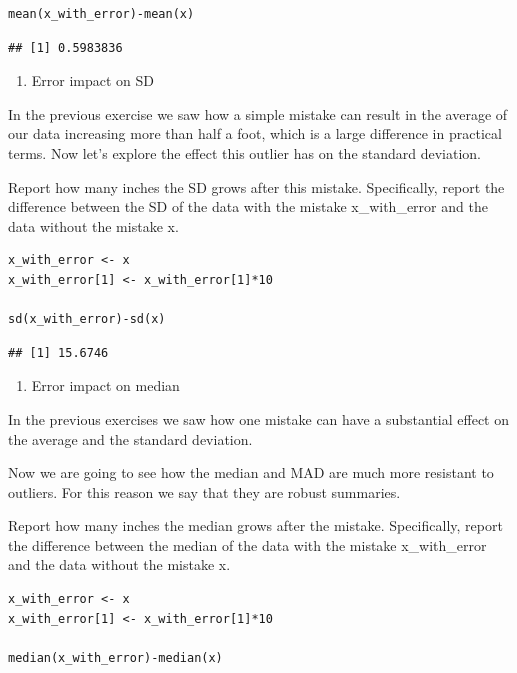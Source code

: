\documentclass[
]{article}
\providecommand{\tightlist}{%
  \setlength{\itemsep}{0pt}\setlength{\parskip}{0pt}}
\begin{document}
\begin{verbatim}
mean(x_with_error)-mean(x)
\end{verbatim}

\begin{verbatim}
## [1] 0.5983836
\end{verbatim}

\begin{enumerate}
\def\labelenumi{\arabic{enumi}.}
\setcounter{enumi}{3}
\tightlist
\item
  Error impact on SD
\end{enumerate}

In the previous exercise we saw how a simple mistake can result in the
average of our data increasing more than half a foot, which is a large
difference in practical terms. Now let's explore the effect this outlier
has on the standard deviation.

Report how many inches the SD grows after this mistake. Specifically,
report the difference between the SD of the data with the mistake
x\_with\_error and the data without the mistake x.

\begin{verbatim}
x_with_error <- x
x_with_error[1] <- x_with_error[1]*10

sd(x_with_error)-sd(x)
\end{verbatim}

\begin{verbatim}
## [1] 15.6746
\end{verbatim}

\begin{enumerate}
\def\labelenumi{\arabic{enumi}.}
\setcounter{enumi}{4}
\tightlist
\item
  Error impact on median
\end{enumerate}

In the previous exercises we saw how one mistake can have a substantial
effect on the average and the standard deviation.

Now we are going to see how the median and MAD are much more resistant
to outliers. For this reason we say that they are robust summaries.

Report how many inches the median grows after the mistake. Specifically,
report the difference between the median of the data with the mistake
x\_with\_error and the data without the mistake x.

\begin{verbatim}
x_with_error <- x
x_with_error[1] <- x_with_error[1]*10

median(x_with_error)-median(x)
\end{verbatim}
\end{document}
